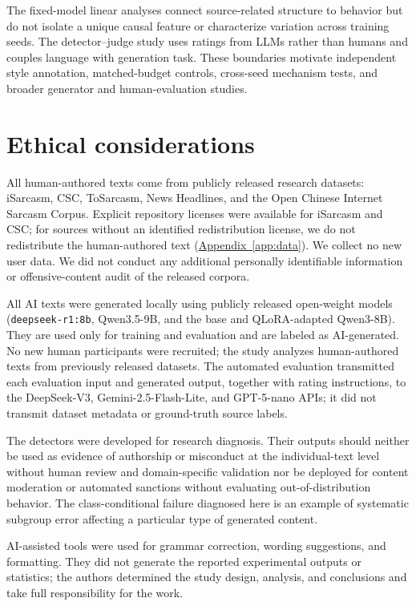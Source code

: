 \documentclass[11pt]{article}
\newcommand{\Appref}[1]{\hyperref[#1]{Appendix~\ref*{#1}}}
\begin{document}
The fixed-model linear analyses connect source-related structure to behavior but do not isolate a unique causal feature or characterize variation across training seeds. The detector--judge study uses ratings from LLMs rather than humans and couples language with generation task. These boundaries motivate independent style annotation, matched-budget controls, cross-seed mechanism tests, and broader generator and human-evaluation studies.

\section*{Ethical considerations}

All human-authored texts come from publicly released research datasets: iSarcasm, CSC, ToSarcasm, News Headlines, and the Open Chinese Internet Sarcasm Corpus. Explicit repository licenses were available for iSarcasm and CSC; for sources without an identified redistribution license, we do not redistribute the human-authored text (\Appref{app:data}). We collect no new user data. We did not conduct any additional personally identifiable information or offensive-content audit of the released corpora.

All AI texts were generated locally using publicly released open-weight models (\texttt{deepseek-r1:8b}, Qwen3.5-9B, and the base and QLoRA-adapted Qwen3-8B). They are used only for training and evaluation and are labeled as AI-generated. No new human participants were recruited; the study analyzes human-authored texts from previously released datasets. The automated evaluation transmitted each evaluation input and generated output, together with rating instructions, to the DeepSeek-V3, Gemini-2.5-Flash-Lite, and GPT-5-nano APIs; it did not transmit dataset metadata or ground-truth source labels.

The detectors were developed for research diagnosis. Their outputs should neither be used as evidence of authorship or misconduct at the individual-text level without human review and domain-specific validation nor be deployed for content moderation or automated sanctions without evaluating out-of-distribution behavior. The class-conditional failure diagnosed here is an example of systematic subgroup error affecting a particular type of generated content.

AI-assisted tools were used for grammar correction, wording suggestions, and formatting. They did not generate the reported experimental outputs or statistics; the authors determined the study design, analysis, and conclusions and take full responsibility for the work.



\appendix


\end{document}
